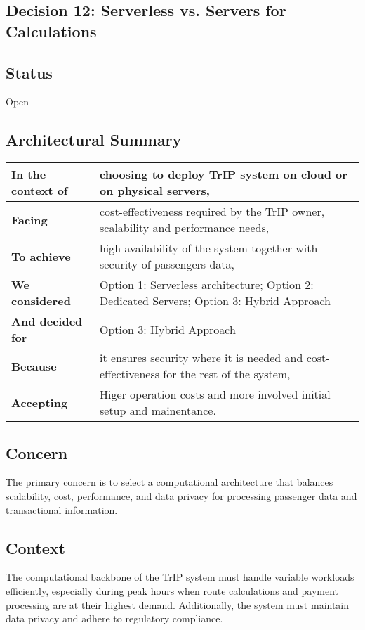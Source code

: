 \subsection{Decision 12: Serverless vs. Servers for Calculations}

\subsection*{Status}
Open

\subsection*{Architectural Summary}
\begin{tabular}{|p{3.5cm}|p{10.5cm}|}
    \hline
    \textbf{In the context of} & choosing to deploy TrIP system on cloud or on physical servers, \\
    \hline
    \textbf{Facing} & cost-effectiveness required by the TrIP owner, scalability and performance needs, \\
    \hline
    \textbf{To achieve} & high availability of the system together with security of passengers data, \\
    \hline
    \textbf{We considered} & Option 1: Serverless architecture; Option 2: Dedicated Servers; Option 3: Hybrid Approach\\
    \hline
    \textbf{And decided for} & Option 3: Hybrid Approach \\
    \hline
    \textbf{Because} & it ensures security where it is needed and cost-effectiveness for the rest of the system, \\
    \hline
    \textbf{Accepting} & Higer operation costs and more involved initial setup and mainentance. \\
    \hline
\end{tabular}

\subsection*{Concern}
The primary concern is to select a computational architecture that balances scalability, cost, performance, and data privacy for processing passenger data and transactional information.

\subsection*{Context}
The computational backbone of the TrIP system must handle variable workloads efficiently, especially during peak hours when route calculations and payment processing are at their highest demand. Additionally, the system must maintain data privacy and adhere to regulatory compliance.

